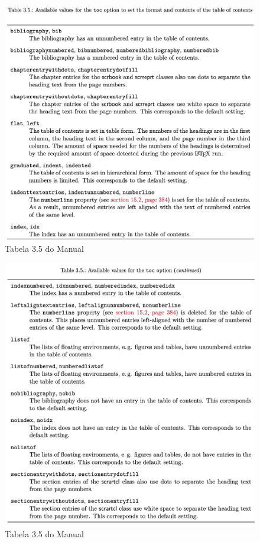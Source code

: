 \begin{figure}
    \centering
    \includegraphics[width=1\linewidth]{imagens/tab3_5.png}
    \caption{Tabela 3.5 do Manual}
    \label{fig:tab3_5}
\end{figure}

\begin{figure}
    \centering
    \includegraphics[width=1\linewidth]{imagens/tab3_5b.png}
    \caption{Tabela 3.5 do Manual}
    \label{fig:tab3_5b}
\end{figure}

